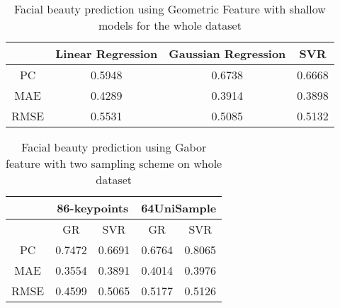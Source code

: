 \documentclass[10pt,conference,a4paper]{IEEEtran}
\begin{document}
\begin{table}[!ht]
\centering
\caption{Facial beauty prediction using Geometric Feature with shallow models for the whole dataset}
\label{tab_geometric_all}
\begin{tabular}{cccc}
\toprule
 & Linear Regression & Gaussian Regression & SVR \\
\midrule
PC & 0.5948 & 0.6738 & 0.6668 \\
MAE & 0.4289 & 0.3914 & 0.3898 \\
RMSE & 0.5531 & 0.5085 & 0.5132 \\
\bottomrule
\end{tabular}
\end{table}

\begin{table}[!t]
\centering
\caption{Facial beauty prediction using Gabor feature with two sampling scheme on whole dataset}
\label{tab_gabor_all}
\begin{tabular}{c|cc|cc}
\hline
\multirow{2}{*}{} & \multicolumn{2}{c|}{86-keypoints} & \multicolumn{2}{c}{64UniSample} \\
\hline
\hline
 & GR & SVR & GR & SVR  \\
\hline
PC & 0.7472 & 0.6691 & 0.6764 &0.8065 \\
MAE & 0.3554 & 0.3891 & 0.4014 & 0.3976 \\
RMSE & 0.4599 & 0.5065 & 0.5177 & 0.5126  \\
\hline
\end{tabular}
\end{table}
\end{document}
